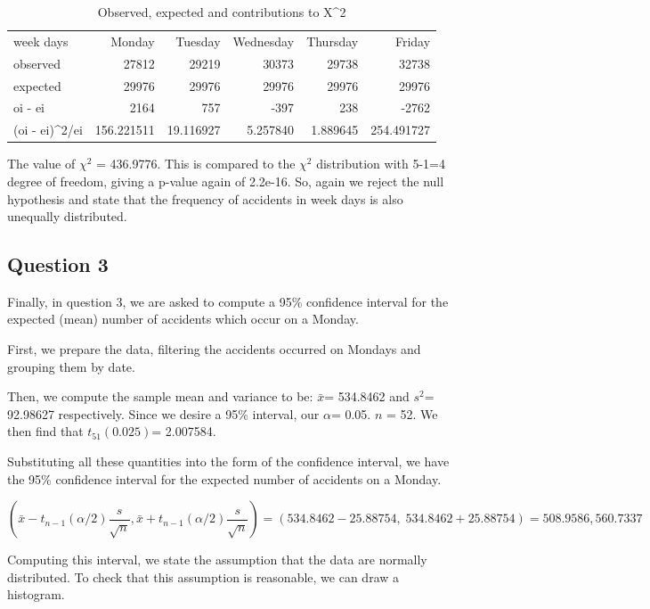 \documentclass[]{article}
\begin{document}
\begin{longtable}[]{@{}lrrrrr@{}}
\caption{Observed, expected and contributions to X\^{}2}\tabularnewline
\toprule
week days & Monday & Tuesday & Wednesday & Thursday &
Friday\tabularnewline
observed & 27812 & 29219 & 30373 & 29738 & 32738\tabularnewline
expected & 29976 & 29976 & 29976 & 29976 & 29976\tabularnewline
oi - ei & 2164 & 757 & -397 & 238 & -2762\tabularnewline
(oi - ei)\^{}2/ei & 156.221511 & 19.116927 & 5.257840 & 1.889645 &
254.491727\tabularnewline
\bottomrule
\end{longtable}

The value of \(\chi ^2\) = 436.9776. This is compared to the \(\chi ^2\)
distribution with 5-1=4 degree of freedom, giving a p-value again of
2.2e-16. So, again we reject the null hypothesis and state that the
frequency of accidents in week days is also unequally distributed.

\subsection{Question 3}\label{question-3}

Finally, in question 3, we are asked to compute a 95\% confidence
interval for the expected (mean) number of accidents which occur on a
Monday.

First, we prepare the data, filtering the accidents occurred on Mondays
and grouping them by date.

Then, we compute the sample mean and variance to be: \(\bar{x}\)=
534.8462 and \(s^2\)= 92.98627 respectively. Since we desire a 95\%
interval, our \(\alpha\)= 0.05. \(n\) = 52. We then find that
\(t_{51}(0.025)\)= 2.007584.

Substituting all these quantities into the form of the confidence
interval, we have the 95\% confidence interval for the expected number
of accidents on a Monday.

\[\left ( \bar{x} -t_{n-1}(\alpha /2)\frac{s}{\sqrt{n}}, \bar{x} +t_{n-1}(\alpha /2)\frac{s}{\sqrt{n}}\right) = (534.8462-25.88754,\; 534.8462+25.88754) = 508.9586, 560.7337 \]

Computing this interval, we state the assumption that the data are
normally distributed. To check that this assumption is reasonable, we
can draw a histogram.
\end{document}
